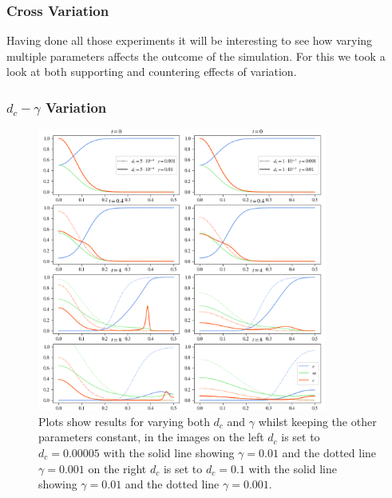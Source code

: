 \subsubsection*{Cross Variation}
Having done all those experiments it will be interesting to see how varying multiple parameters affects the outcome of the simulation. For this we took a look at both supporting and countering effects of variation. 

\subsubsection*{$d_c - \gamma$ Variation}
\begin{figure}[h]
    \centering
    \includegraphics[width=0.85\textwidth]{resources/images/dc_gamma_variation.png}
    \caption{Plots show results for varying both $d_c$ and $\gamma$ whilst keeping the other parameters constant, in the images on the left $d_c$ is set to $d_c=0.00005$ with the solid line showing $\gamma = 0.01$ and the dotted line $\gamma=0.001$ on the right $d_c$ is set to $d_c=0.1$ with the solid line showing $\gamma = 0.01$ and the dotted line $\gamma=0.001$.}
    \label{fig:dc_gamma_variation}
\end{figure}


